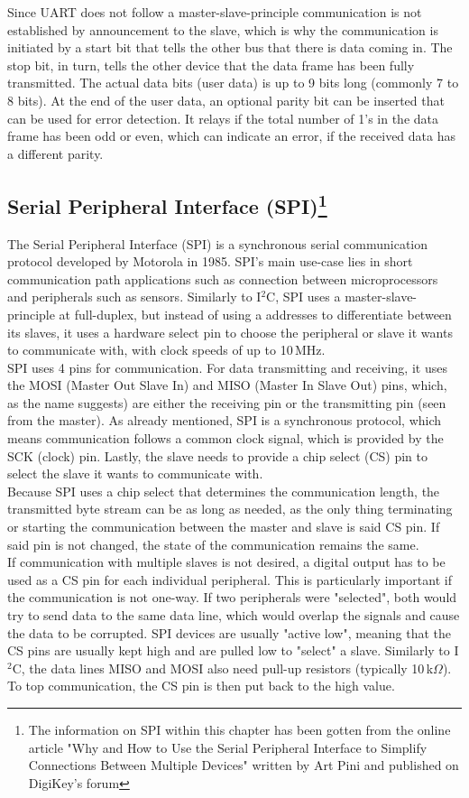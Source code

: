\documentclass[fontsize=11pt,%
twoside,%
BCOR          = 8mm, %
DIV           = 11,  %
titlepage     = off,%
index=totoc,%
xcolor        = pdftex,%
dvipsnames,%
bibliography  = totoc,%
bibliography = numbered, %
listof        = notnumbered]{scrreprt}
\begin{document}
Since UART does not follow a master-slave-principle communication is not established by announcement to the slave, which is why the communication is initiated by a start bit that tells the other bus that there is data coming in. The stop bit, in turn, tells the other device that the data frame has been fully transmitted. The actual data bits (user data) is up to 9 bits long (commonly 7 to 8 bits). At the end of the user data, an optional parity bit can be inserted that can be used for error detection. It relays if the total number of 1's in the data frame has been odd or even, which can indicate an error, if the received data has a different parity.

\subsection{Serial Peripheral Interface (SPI)\footnote{The information on SPI within this chapter has been gotten from the online article "Why and How to Use the Serial Peripheral Interface to Simplify Connections Between Multiple Devices" written by Art Pini\cite{SPI} and published on DigiKey's forum}}
The Serial Peripheral Interface (SPI) is a synchronous serial communication protocol developed by Motorola in 1985. SPI's main use-case lies in short communication path applications such as connection between microprocessors and peripherals such as sensors. Similarly to I$^2$C, SPI uses a master-slave-principle at full-duplex, but instead of using a addresses to differentiate between its slaves, it uses a hardware select pin to choose the peripheral or slave it wants to communicate with, with clock speeds of up to 10\,MHz.\\
SPI uses 4 pins for communication. For data transmitting and receiving, it uses the MOSI (Master Out Slave In) and MISO (Master In Slave Out) pins, which, as the name suggests) are either the receiving pin or the transmitting pin (seen from the master). As already mentioned, SPI is a synchronous protocol, which means communication follows a common clock signal, which is provided by the SCK (clock) pin. Lastly, the slave needs to provide a chip select (CS) pin to select the slave it wants to communicate with.\\
Because SPI uses a chip select that determines the communication length, the transmitted byte stream can be as long as needed, as the only thing terminating or starting the communication between the master and slave is said CS pin. If said pin is not changed, the state of the communication remains the same.\\
If communication with multiple slaves is not desired, a digital output has to be used as a CS pin for each individual peripheral. This is particularly important if the communication is not one-way. If two peripherals were "selected", both would try to send data to the same data line, which would overlap the signals and cause the data to be corrupted. SPI devices are usually "active low", meaning that the CS pins are usually kept high and are pulled low to "select" a slave. Similarly to I$^2$C, the data lines MISO and MOSI also need pull-up resistors (typically 10\,k$\Omega$). To top communication, the CS pin is then put back to the high value.
\end{document}
